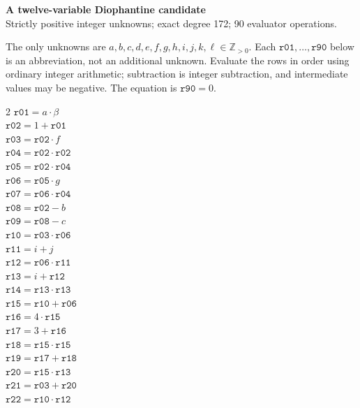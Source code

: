 \documentclass[10pt]{article}
\begin{document}
\begin{center}
{\large\bfseries A twelve-variable Diophantine candidate}\\
{\small Strictly positive integer unknowns; exact degree 172; 90 evaluator operations.}
\end{center}
The only unknowns are \(a,b,c,d,e,f,g,h,i,j,k,\ell\in\mathbb Z_{>0}\).
Each \(\mathtt{r01},\ldots,\mathtt{r90}\) below is an abbreviation,
not an additional unknown. Evaluate the rows in order using ordinary integer
arithmetic; subtraction is integer subtraction, and intermediate values may be
negative. The equation is
\(\boxed{\mathtt{r90}=0}\).

\begin{multicols}{2}\small
\(\mathtt{r01} = a \cdot \beta\)\\
\(\mathtt{r02} = 1 + \mathtt{r01}\)\\
\(\mathtt{r03} = \mathtt{r02} \cdot f\)\\
\(\mathtt{r04} = \mathtt{r02} \cdot \mathtt{r02}\)\\
\(\mathtt{r05} = \mathtt{r02} \cdot \mathtt{r04}\)\\
\(\mathtt{r06} = \mathtt{r05} \cdot g\)\\
\(\mathtt{r07} = \mathtt{r06} \cdot \mathtt{r04}\)\\
\(\mathtt{r08} = \mathtt{r02} - b\)\\
\(\mathtt{r09} = \mathtt{r08} - c\)\\
\(\mathtt{r10} = \mathtt{r03} \cdot \mathtt{r06}\)\\
\(\mathtt{r11} = i + j\)\\
\(\mathtt{r12} = \mathtt{r06} \cdot \mathtt{r11}\)\\
\(\mathtt{r13} = i + \mathtt{r12}\)\\
\(\mathtt{r14} = \mathtt{r13} \cdot \mathtt{r13}\)\\
\(\mathtt{r15} = \mathtt{r10} + \mathtt{r06}\)\\
\(\mathtt{r16} = 4 \cdot \mathtt{r15}\)\\
\(\mathtt{r17} = 3 + \mathtt{r16}\)\\
\(\mathtt{r18} = \mathtt{r15} \cdot \mathtt{r15}\)\\
\(\mathtt{r19} = \mathtt{r17} + \mathtt{r18}\)\\
\(\mathtt{r20} = \mathtt{r15} \cdot \mathtt{r13}\)\\
\(\mathtt{r21} = \mathtt{r03} + \mathtt{r20}\)\\
\(\mathtt{r22} = \mathtt{r10} \cdot \mathtt{r12}\)\\

\end{multicols}
\end{document}
